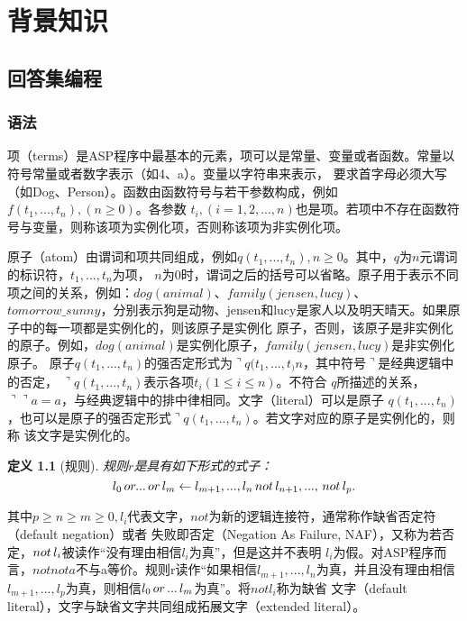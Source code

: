 \newtheorem{definition}{定义}[section]
\newtheorem{example}{例}[section]
\chapter{背景知识}
\section{回答集编程}
\subsection{语法}
项（terms）是ASP程序中最基本的元素，项可以是常量、变量或者函数。常量以符号常量或者数字表示（如4、a）。变量以字符串来表示，
要求首字母必须大写（如Dog、Person）。函数由函数符号与若干参数构成，例如$f(t_1,...,t_n),(n \geq 0)$。各参数
$t_i,(i=1,2,...,n)$也是项。若项中不存在函数符号与变量，则称该项为实例化项，否则称该项为非实例化项。

原子（atom）由谓词和项共同组成，例如$q(t_1,...,t_n),n \geq 0$。其中，$q$为$n$元谓词的标识符，$t_1,...,t_n$为项，
$n$为0时，谓词之后的括号可以省略。原子用于表示不同项之间的关系，例如：$dog(animal)$、$family(jensen,lucy)$、
$tomorrow\_sunny$，分别表示狗是动物、jensen和lucy是家人以及明天晴天。如果原子中的每一项都是实例化的，则该原子是实例化
原子，否则，该原子是非实例化的原子。例如，$dog(animal)$是实例化原子，$family(jensen,lucy)$是非实例化原子。
原子$q(t_1,...,t_n)$的强否定形式为$\urcorner q(t_1,...,t_)n$，其中符号$\urcorner$是经典逻辑中的否定，
$\urcorner q(t_1,...,t_n)$表示各项$t_i(1 \leq i \leq n)$。不符合
$q$所描述的关系，$\urcorner \urcorner a = a$，与经典逻辑中的排中律相同。文字（literal）可以是原子
$q(t_1,...,t_n)$，也可以是原子的强否定形式$\urcorner q(t_1,...,t_n)$。若文字对应的原子是实例化的，则称
该文字是实例化的。

\begin{definition}[规则] 规则$r$是具有如下形式的式子：
    \begin{equation}
        l_0 \thinspace or ... \thinspace or \thinspace l_m \leftarrow l_{m+1},...,l_n \thinspace not \thinspace l_{n+1},...,\thinspace not \thinspace l_p.
    \end{equation}
\end{definition}

其中$p \ge n \ge m \geq 0, l_i$代表文字，$not$为新的逻辑连接符，通常称作缺省否定符（default negation）或者
失败即否定（Negation As Failure, NAF），又称为若否定，$not \thinspace l_i$被读作“没有理由相信$l_i$为真”，但是这并不表明
$l_i$为假。对ASP程序而言，$not not a$不与a等价。规则r读作“如果相信$l_{m+1},...,l_n$为真，并且没有理由相信
$l_{m+1},...,l_p$为真，则相信$l_0 \thinspace or \thinspace ... \thinspace l_m$为真”。将$not l_i$称为缺省
文字（default literal），文字与缺省文字共同组成拓展文字（extended literal）。


